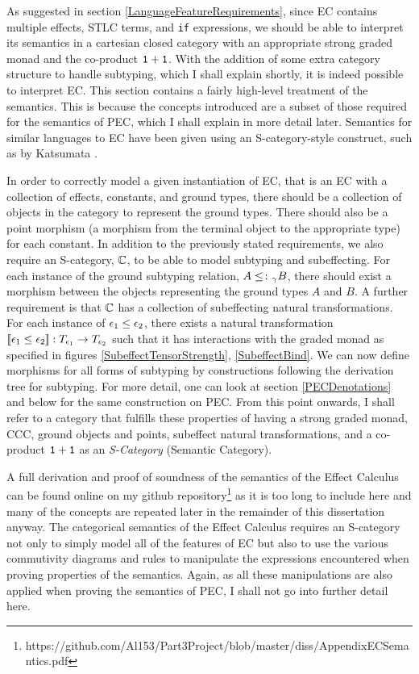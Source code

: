 \documentclass{Report}
\begin{document}
As suggested in section \ref{LanguageFeatureRequirements}, since EC contains multiple effects, STLC terms, and \texttt{if} expressions, we should be able to interpret its semantics in a cartesian closed category with an appropriate strong graded monad and the co-product $\texttt{1} + \texttt{1}$. With the addition of some extra category structure to handle subtyping, which I shall explain shortly, it is indeed possible to interpret EC. This section contains a fairly high-level treatment of the semantics. This is because the concepts introduced are a subset of those required for the semantics of PEC, which I shall explain in more detail later. Semantics for similar languages to EC have been given using an S-category-style construct, such as by Katsumata \cite{Katsumata:2014}.


\begin{framed}
    \begin{definition}[S-Category]
        In order to correctly model a given instantiation of EC, that is an EC with a collection of effects, constants, and ground types, there should be a collection of objects in the category to represent the ground types. There should also be a point morphism (a morphism from the terminal object to the appropriate type) for each constant. In addition to the previously stated requirements, we also require an S-category, $\mathbb{C}$, to be able to model subtyping and subeffecting. For each instance of the ground subtyping relation, $A \leq\colon_\gamma B$, there should exist a morphism between the objects representing the ground types $A$ and $B$. A further requirement is that $\mathbb{C}$ has a collection of subeffecting natural transformations. For each instance of $\epsilon_1 \leq \epsilon_2$, there exists a natural transformation ${\bf [\![}\epsilon_1\leq\epsilon_2{\bf ]\!]}: T_{\epsilon_1}{}\rightarrow T_{\epsilon_2}{}$ such that it has interactions with the graded monad as specified in figures \ref{SubeffectTensorStrength}, \ref{SubeffectBind}. We can now define morphisms for all forms of subtyping by constructions following the derivation tree for subtyping. For more detail, one can look at section \ref{PECDenotations} and below for the same construction on PEC. From this point onwards, I shall refer to a category that fulfills these properties of having a strong graded monad, CCC, ground objects and points, subeffect natural transformations, and a co-product $\texttt{1} + \texttt{1}$ as an \textit{S-Category} (Semantic Category).
    \end{definition}
\end{framed}

A full derivation and proof of soundness of the semantics of the Effect Calculus can be found online on my github repository\footnote{https://github.com/Al153/Part3Project/blob/master/diss/AppendixECSemantics.pdf} as it is too long to include here and many of the concepts are repeated later in the remainder of this dissertation anyway. The categorical semantics of the Effect Calculus requires an S-category not only to simply model all of the features of EC but also to use the various commutivity diagrams and rules to manipulate the expressions encountered when proving properties of the semantics. Again, as all these manipulations are also applied when proving the semantics of PEC, I shall not go into further detail here.
\end{document}
